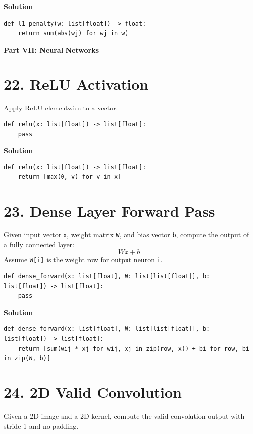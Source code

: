 \documentclass[11pt]{article}
\begin{document}
\medskip
\noindent\textbf{Solution}
\begin{lstlisting}
def l1_penalty(w: list[float]) -> float:
    return sum(abs(wj) for wj in w)
\end{lstlisting}

\vspace{0.75em}
\noindent\textbf{\large Part VII: Neural Networks}
\vspace{0.5em}

\section*{22. ReLU Activation}
Apply ReLU elementwise to a vector.

\begin{lstlisting}
def relu(x: list[float]) -> list[float]:
    pass
\end{lstlisting}

\medskip
\noindent\textbf{Solution}
\begin{lstlisting}
def relu(x: list[float]) -> list[float]:
    return [max(0, v) for v in x]
\end{lstlisting}

\section*{23. Dense Layer Forward Pass}
Given input vector \texttt{x}, weight matrix \texttt{W}, and bias vector \texttt{b}, compute the output of a fully connected layer:
\[
Wx + b
\]
Assume \texttt{W[i]} is the weight row for output neuron \texttt{i}.

\begin{lstlisting}
def dense_forward(x: list[float], W: list[list[float]], b: list[float]) -> list[float]:
    pass
\end{lstlisting}

\medskip
\noindent\textbf{Solution}
\begin{lstlisting}
def dense_forward(x: list[float], W: list[list[float]], b: list[float]) -> list[float]:
    return [sum(wij * xj for wij, xj in zip(row, x)) + bi for row, bi in zip(W, b)]
\end{lstlisting}

\section*{24. 2D Valid Convolution}
Given a 2D image and a 2D kernel, compute the valid convolution output with stride 1 and no padding.
\end{document}
